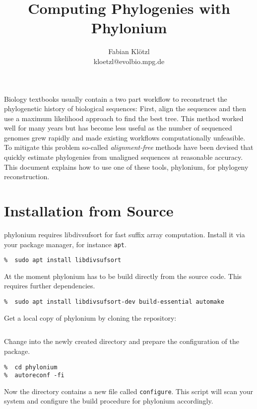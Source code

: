 \documentclass[a4paper,10pt,english]{scrartcl}
\title{Computing Phylogenies with Phylonium}
\author{Fabian Klötzl\\\normalsize{kloetzl@evolbio.mpg.de}}
\date{\isodate{\today}}
\newcommand{\tool}[1]{\textsf{#1}}
\newcommand{\phylonium}{\textsf{phylonium}\xspace}
\begin{document}
\frenchspacing
\maketitle


Biology textbooks usually contain a two part workflow to reconstruct the phylogenetic history of biological sequences: %
First, align the sequences and then use a maximum likelihood approach to find the best tree. This method worked well for many years but has become less useful as the number of sequenced genomes grew rapidly and made existing workflows computationally unfeasible. To mitigate this problem so-called \emph{alignment-free} methods have been devised that quickly estimate phylogenies from unaligned sequences at reasonable accuracy. This document explains how to use one of these tools, \phylonium, for phylogeny reconstruction. 

\section{Installation from Source}

\phylonium requires \tool{libdivsufsort} for fast suffix array computation. Install it via your package manager, for instance \lstinline!apt!.

\begin{lstlisting}
%  sudo apt install libdivsufsort
\end{lstlisting}

At the moment \phylonium has to be build directly from the source code. This requires further dependencies.

\begin{lstlisting}
%  sudo apt install libdivsufsort-dev build-essential automake
\end{lstlisting}

Get a local copy of \phylonium by cloning the repository:

\begin{lstlisting}[language=bash]
%  git clone https://github.com/evolbioinf/phylonium
\end{lstlisting}

Change into the newly created directory and prepare the configuration of the package.

\begin{lstlisting}
%  cd phylonium
%  autoreconf -fi
\end{lstlisting}

Now the directory contains a new file called \lstinline!configure!. This script will scan your system and configure the build procedure for \phylonium accordingly.
\end{document}
